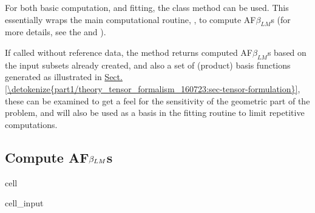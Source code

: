 \documentclass[letterpaper,table,10pt,english]{jupyterBook}
\begin{document}
\sphinxAtStartPar
For both basic computation, and fitting, the class method  can be used. This essentially wraps the main {\hyperref[\detokenize{backmatter/glossary:term-AF}]{}} computational routine, , to compute AF\sphinxhyphen{}\(\beta_{LM}\)s (for more details, see the  and ).

\sphinxAtStartPar
If called without reference data, the method returns computed AF\sphinxhyphen{}\(\beta_{LM}\)s based on the input subsets already created, and also a set of (product) basis functions generated \sphinxhyphen{} as illustrated in \hyperref[\detokenize{part1/theory_tensor_formalism_160723:sec-tensor-formulation}]{Sect.\@ \ref{\detokenize{part1/theory_tensor_formalism_160723:sec-tensor-formulation}}}, these can be examined to get a feel for the sensitivity of the geometric part of the problem, and will also be used as a basis in the fitting routine to limit repetitive computations.


\subsection{Compute AF\sphinxhyphen{}\protect\(\beta_{LM}\protect\)s}
\label{\detokenize{part2/basic_fitting_numerics_intro_260723:compute-af-beta-lm-s}}
\begin{sphinxuseclass}{cell}\begin{sphinxVerbatimInput}

\begin{sphinxuseclass}{cell_input}
\begin{sphinxVerbatim}[commandchars=\\\{\}]
    
\end{sphinxVerbatim}

\end{sphinxuseclass}\end{sphinxVerbatimInput}

\end{sphinxuseclass}
\end{document}
